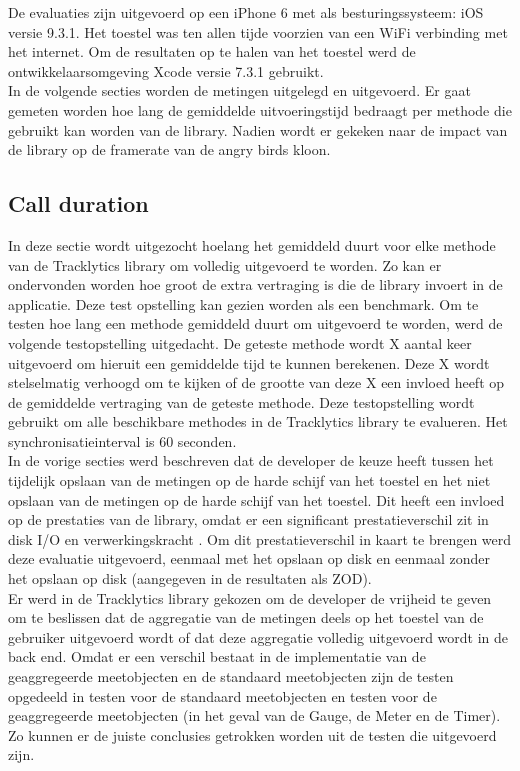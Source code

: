 De evaluaties zijn uitgevoerd op een iPhone 6 \cite{iPhone} met als besturingssysteem: iOS versie 9.3.1. Het toestel was ten allen tijde voorzien van een WiFi verbinding met het internet. Om de resultaten op te halen van het toestel werd de ontwikkelaarsomgeving Xcode \cite{Xcode} versie 7.3.1 gebruikt.\\

In de volgende secties worden de metingen uitgelegd en uitgevoerd. Er gaat gemeten worden hoe lang de gemiddelde uitvoeringstijd bedraagt per methode die gebruikt kan worden van de library. Nadien wordt er gekeken naar de impact van de library op de framerate van de angry birds kloon.\\

\subsection{Call duration}
In deze sectie wordt uitgezocht hoelang het gemiddeld duurt voor elke methode van de Tracklytics library om volledig uitgevoerd te worden. Zo kan er ondervonden worden hoe groot de extra vertraging is die de library invoert in de applicatie. Deze test opstelling kan gezien worden als een benchmark. Om te testen hoe lang een methode gemiddeld duurt om uitgevoerd te worden, werd de volgende testopstelling uitgedacht. De geteste methode wordt X aantal keer uitgevoerd om hieruit een gemiddelde tijd te kunnen berekenen. Deze X wordt stelselmatig verhoogd om te kijken of de grootte van deze X een invloed heeft op de gemiddelde vertraging van de geteste methode. Deze testopstelling wordt gebruikt om alle beschikbare methodes in de Tracklytics library te evalueren. Het synchronisatieinterval is 60 seconden. \\

In de vorige secties werd beschreven dat de developer de keuze heeft tussen het tijdelijk opslaan van de metingen op de harde schijf van het toestel en het niet opslaan van de metingen op de harde schijf van het toestel. Dit heeft een invloed op de prestaties van de library, omdat er een significant prestatieverschil zit in disk I/O en verwerkingskracht \cite{diskIO}. Om dit prestatieverschil in kaart te brengen werd deze evaluatie uitgevoerd, eenmaal met het opslaan op disk en eenmaal zonder het opslaan op disk (aangegeven in de resultaten als ZOD).\\

Er werd in de Tracklytics library gekozen om de developer de vrijheid te geven om te beslissen dat de aggregatie van de metingen deels op het toestel van de gebruiker uitgevoerd wordt of dat deze aggregatie volledig uitgevoerd wordt in de back end. Omdat er een verschil bestaat in de implementatie van de geaggregeerde meetobjecten en de standaard meetobjecten zijn de testen opgedeeld in testen voor de standaard meetobjecten en testen voor de geaggregeerde meetobjecten (in het geval van de Gauge, de Meter en de Timer). Zo kunnen er de juiste conclusies getrokken worden uit de testen die uitgevoerd zijn.\\

